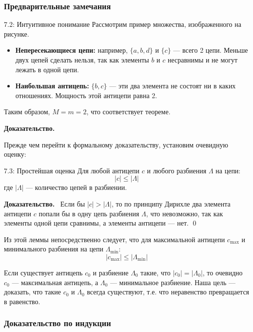 \documentclass[a4paper,12pt]{article}
\newcommand{\myproof}{\textbf{Доказательство.}\ }
\begin{document}
	\subsubsection{Предварительные замечания}
	
	\begin{remarkbox}{7.2: Интуитивное понимание}
		Рассмотрим пример множества, изображенного на рисунке. 
		\begin{itemize}
			\item \textbf{Непересекающиеся цепи:} например, $\{a, b, d\}$ и $\{c\}$ — всего 2 цепи. Меньше двух цепей сделать нельзя, так как элементы $b$ и $c$ несравнимы и не могут лежать в одной цепи.
			\item \textbf{Наибольшая антицепь:} $\{b, c\}$ — эти два элемента не состоят ни в каких отношениях. Мощность этой антицепи равна 2.
		\end{itemize}
		Таким образом, $M = m = 2$, что соответствует теореме.
	\end{remarkbox}
	
	\myproof
	
	Прежде чем перейти к формальному доказательству, установим очевидную оценку:
	
	\begin{lemmabox}{7.3: Простейшая оценка}
		Для любой антицепи $c$ и любого разбиения $\Lambda$ на цепи:
		\[ |c| \le |\Lambda| \]
		где $|\Lambda|$ — количество цепей в разбиении.
	\end{lemmabox}
	
	\myproof
	Если бы $|c| > |\Lambda|$, то по принципу Дирихле два элемента антицепи $c$ попали бы в одну цепь разбиения $\Lambda$, что невозможно, так как элементы одной цепи сравнимы, а элементы антицепи — нет. \qed
	
	Из этой леммы непосредственно следует, что для максимальной антицепи $c_{\text{max}}$ и минимального разбиения на цепи $\Lambda_{\text{min}}$:
	\[ |c_{\text{max}}| \le |\Lambda_{\text{min}}| \]
	
	Если существует антицепь $c_0$ и разбиение $\Lambda_0$ такие, что $|c_0| = |\Lambda_0|$, то очевидно $c_0$ — максимальная антицепь, а $\Lambda_0$ — минимальное разбиение. Наша цель — доказать, что такие $c_0$ и $\Lambda_0$ всегда существуют, т.е. что неравенство превращается в равенство.
	
	\subsubsection{Доказательство по индукции}
	
\end{document}
